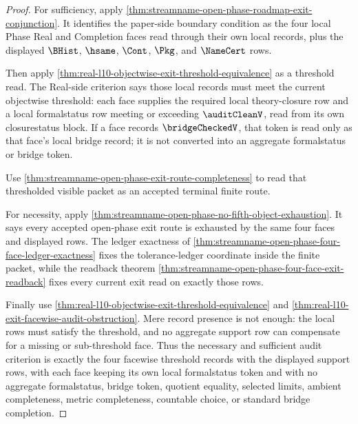 \begin{proof}
For sufficiency, apply \autoref{thm:streamname-open-phase-roadmap-exit-conjunction}. It identifies the paper-side boundary condition as the four local Phase Real and Completion faces read through their own local records, plus the displayed $\BHist$, $\hsame$, $\Cont$, $\Pkg$, and $\NameCert$ rows.

Then apply \autoref{thm:real-l10-objectwise-exit-threshold-equivalence} as a threshold read. The Real-side criterion says those local records must meet the current objectwise threshold: each face supplies the required local theory-closure row and a local formalstatus row meeting or exceeding $\auditCleanV$, read from its own closurestatus block. If a face records $\bridgeCheckedV$, that token is read only as that face's local bridge record; it is not converted into an aggregate formalstatus or bridge token.

Use \autoref{thm:streamname-open-phase-exit-route-completeness} to read that thresholded visible packet as an accepted terminal finite route.

For necessity, apply \autoref{thm:streamname-open-phase-no-fifth-object-exhaustion}. It says every accepted open-phase exit route is exhausted by the same four faces and displayed rows. The ledger exactness of \autoref{thm:streamname-open-phase-four-face-ledger-exactness} fixes the tolerance-ledger coordinate inside the finite packet, while the readback theorem \autoref{thm:streamname-open-phase-four-face-exit-readback} fixes every current exit read on exactly those rows.

Finally use \autoref{thm:real-l10-objectwise-exit-threshold-equivalence} and \autoref{thm:real-l10-exit-facewise-audit-obstruction}. Mere record presence is not enough: the local rows must satisfy the threshold, and no aggregate support row can compensate for a missing or sub-threshold face. Thus the necessary and sufficient audit criterion is exactly the four facewise threshold records with the displayed support rows, with each face keeping its own local formalstatus token and with no aggregate formalstatus, bridge token, quotient equality, selected limits, ambient completeness, metric completeness, countable choice, or standard bridge completion.
\end{proof}

